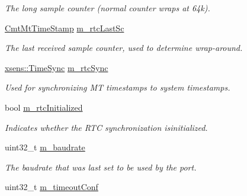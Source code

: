 \begin{DoxyCompactItemize}
\begin{DoxyCompactList}\small\item\em \-The long sample counter (normal counter wraps at 64k). \end{DoxyCompactList}\item 
\hypertarget{classxsens_1_1Cmt3_a0b78c5fe67debc9f6945b810634f7871}{\hyperlink{cmtdef_8h_ac31e8e3eec45b98b6fa08eedfa4da330}{\-Cmt\-Mt\-Time\-Stamp} \hyperlink{classxsens_1_1Cmt3_a0b78c5fe67debc9f6945b810634f7871}{m\-\_\-rtc\-Last\-Sc}}\label{classxsens_1_1Cmt3_a0b78c5fe67debc9f6945b810634f7871}

\begin{DoxyCompactList}\small\item\em \-The last received sample counter, used to determine wrap-\/around. \end{DoxyCompactList}\item 
\hypertarget{classxsens_1_1Cmt3_a321670416a0794e463f53870da2cba49}{\hyperlink{classxsens_1_1TimeSync}{xsens\-::\-Time\-Sync} \hyperlink{classxsens_1_1Cmt3_a321670416a0794e463f53870da2cba49}{m\-\_\-rtc\-Sync}}\label{classxsens_1_1Cmt3_a321670416a0794e463f53870da2cba49}

\begin{DoxyCompactList}\small\item\em \-Used for synchronizing \-M\-T timestamps to system timestamps. \end{DoxyCompactList}\item 
\hypertarget{classxsens_1_1Cmt3_a4e6b67861b21b990a38a6618b4a319c8}{bool \hyperlink{classxsens_1_1Cmt3_a4e6b67861b21b990a38a6618b4a319c8}{m\-\_\-rtc\-Initialized}}\label{classxsens_1_1Cmt3_a4e6b67861b21b990a38a6618b4a319c8}

\begin{DoxyCompactList}\small\item\em \-Indicates whether the \-R\-T\-C synchronization isinitialized. \end{DoxyCompactList}\item 
\hypertarget{classxsens_1_1Cmt3_a2714dd5fe37a387ed4852c5d934fc64c}{uint32\-\_\-t \hyperlink{classxsens_1_1Cmt3_a2714dd5fe37a387ed4852c5d934fc64c}{m\-\_\-baudrate}}\label{classxsens_1_1Cmt3_a2714dd5fe37a387ed4852c5d934fc64c}

\begin{DoxyCompactList}\small\item\em \-The baudrate that was last set to be used by the port. \end{DoxyCompactList}\item 
\hypertarget{classxsens_1_1Cmt3_a159e7c6605fd35ad68796a4bd8e8bedd}{uint32\-\_\-t \hyperlink{classxsens_1_1Cmt3_a159e7c6605fd35ad68796a4bd8e8bedd}{m\-\_\-timeout\-Conf}}\label{classxsens_1_1Cmt3_a159e7c6605fd35ad68796a4bd8e8bedd}


\end{DoxyCompactItemize}
